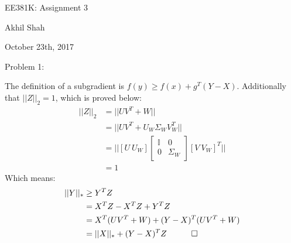 \documentclass{article}
\begin{document}
\begin{center}
    {\huge EE381K: Assignment 3}
\end{center}
\begin{center}
    Akhil Shah
\end{center}
\begin{center}
    October 23th, 2017
\end{center}

\noindent
{\large Problem 1:}
\newline

The definition of a subgradient is $f(y) \geq f(x) + g^T(Y-X)$. Additionally that $||Z||_2 = 1$, which is proved below:
\begin{align*}
	||Z||_2 &= ||UV^T + W|| \\
	&=||UV^T + U_W \Sigma_W V_W^T || \\
	&= ||[U \ U_W] \begin{bmatrix} \mathbb{I} & 0 \\ 0 & \Sigma_W \end{bmatrix} [V \ V_W]^T|| \\
	&= 1
\end{align*}
Which means:
\begin{align*}
	||Y||_* &\geq Y^TZ  \\
	&= X^TZ - X^TZ + Y^TZ \\
	&= X^T(UV^T + W) + (Y-X)^T(UV^T + W) \\
	&= ||X||_* + (Y - X)^TZ \quad \qed
\end{align*}
\end{document}
